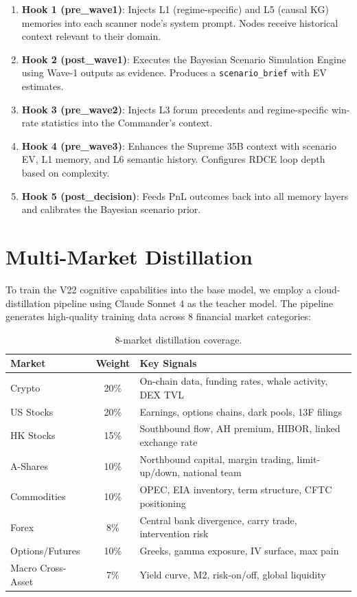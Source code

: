 \documentclass[11pt, a4paper]{article}
\begin{document}
\begin{enumerate}[leftmargin=*]
  \item \textbf{Hook 1 (pre\_wave1)}: Injects L1 (regime-specific) and L5 (causal KG) memories into each scanner node's system prompt. Nodes receive historical context relevant to their domain.
  \item \textbf{Hook 2 (post\_wave1)}: Executes the Bayesian Scenario Simulation Engine using Wave-1 outputs as evidence. Produces a \texttt{scenario\_brief} with EV estimates.
  \item \textbf{Hook 3 (pre\_wave2)}: Injects L3 forum precedents and regime-specific win-rate statistics into the Commander's context.
  \item \textbf{Hook 4 (pre\_wave3)}: Enhances the Supreme 35B context with scenario EV, L1 memory, and L6 semantic history. Configures RDCE loop depth based on complexity.
  \item \textbf{Hook 5 (post\_decision)}: Feeds PnL outcomes back into all memory layers and calibrates the Bayesian scenario prior.
\end{enumerate}


\section{Multi-Market Distillation}
\label{sec:distill}

To train the V22 cognitive capabilities into the base model, we employ a cloud-distillation pipeline using Claude Sonnet 4 as the teacher model. The pipeline generates high-quality training data across 8 financial market categories:

\begin{table}[H]
\centering
\begin{tabular}{lcp{7cm}}
\toprule
\textbf{Market} & \textbf{Weight} & \textbf{Key Signals} \\
\midrule
Crypto & 20\% & On-chain data, funding rates, whale activity, DEX TVL \\
US Stocks & 20\% & Earnings, options chains, dark pools, 13F filings \\
HK Stocks & 15\% & Southbound flow, AH premium, HIBOR, linked exchange rate \\
A-Shares & 10\% & Northbound capital, margin trading, limit-up/down, national team \\
Commodities & 10\% & OPEC, EIA inventory, term structure, CFTC positioning \\
Forex & 8\% & Central bank divergence, carry trade, intervention risk \\
Options/Futures & 10\% & Greeks, gamma exposure, IV surface, max pain \\
Macro Cross-Asset & 7\% & Yield curve, M2, risk-on/off, global liquidity \\
\bottomrule
\end{tabular}
\caption{8-market distillation coverage.}
\label{tab:markets}
\end{table}
\end{document}
